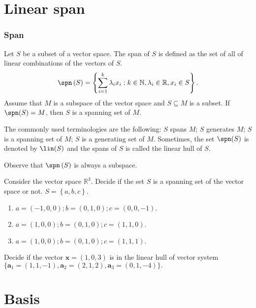 \section{Linear span}
\begin{frame}\frametitle{Span}
    \begin{definition}
    Let $S$ be a subset of a vector space.
    The \alert{span} of $S$ is defined as the set of all of linear combinations of the vectors of $S$.
    \[
        \spn\left( S \right)
        =
        \left\{ \sum_{i=1}^k\lambda_ix_i:k\in\mathbb{N},\lambda_i\in\mathbb{R}, x_i\in S \right\}.
    \]
    Assume that $M$ is a subspace of the vector space and $S\subseteq M$ is a subset.
    If $\spn(S)=M$, then $S$ is a \alert{spanning set of } $M$.
    \end{definition}
    The commonly used terminologies are the following:
    $S$ spans $M$; $S$ generates $M$; $S$ is a spanning set of $M$; $S$ is a generating set of $M$.
    Sometimes, the set $\spn(S)$ is denoted by $\lin(S)$ and the spans of $S$ is called \alert{the linear hull} of $S$.

    Observe that $\spn\left( S \right)$ is always a subspace.
\end{frame}
\begin{frame}
    \begin{example}
        Consider the vector space $\mathbb{R}^3$.
        Decide if the set $S$ is a spanning set of the vector space or not.
        $S=\left\{ a,b,c \right\}$.
        \begin{enumerate}
            \item $a=(-1,0,0); b=\left( 0,1,0 \right); c=\left( 0,0,-1 \right)$.
            \item $a=(1,0,0); b=\left( 0,1,0 \right); c=\left( 1,1,0 \right)$.
            \item $a=(1,0,0); b=\left( 0,1,0 \right); c=\left( 1,1,1 \right)$.
        \end{enumerate}
    \end{example}
\end{frame}
\begin{frame}
\begin{example}
Decide if the vector $\mathbf{x}=(1,0,3)$ is in the linear hull of vector system $\{\mathbf{a}_1=(1,1,-1),\mathbf{a}_2=(2,1,2),\mathbf{a}_3=(0,1,-4)\}.$
\end{example}
\end{frame}
\section{Basis}

